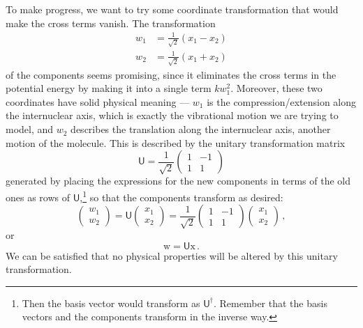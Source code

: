 \documentclass{article}
\theoremstyle{plain}\theoremheaderfont{\normalfont\itshape}\theorembodyfont{\rmfamily}\theoremseparator{.}\newtheorem*{rem}{Remark}\newtheorem*{ex}{Example}\newtheorem*{proof}{Proof}\newtheorem*{altp}{Alternative proof}
\theoremstyle{plain}\theoremheaderfont{\normalfont\bfseries}\theorembodyfont{\rmfamily}\theoremseparator{.}\newtheorem{thm}{Theorem}[section]\newtheorem{lem}[thm]{Lemma}\newtheorem{prop}[thm]{Proposition}\newtheorem*{cor}{Corollary}\newtheorem{defn}[thm]{Definition}\newtheorem{clm}[thm]{Claim}\newtheorem{clminproof}{Claim}
\theoremstyle{break}\theoremheaderfont{\normalfont\itshape}\theorembodyfont{\rmfamily}\theoremseparator{.\medskip}\newtheorem*{proofskip}{Proof}\newtheorem*{exs}{Examples}\newtheorem*{rems}{Remarks}
\theoremstyle{break}\theoremheaderfont{\normalfont\bfseries}\theorembodyfont{\rmfamily}\theoremseparator{.\medskip}\newtheorem{lemskip}[thm]{Lemma}\newtheorem{defnskip}[thm]{Definition}\newtheorem{propskip}[thm]{Proposition}\newtheorem{thmskip}[thm]{Theorem}
\numberwithin{equation}{section}
\newcommand{\vb}[1]{\bm{\mathrm{#1}}}
\begin{document}
    To make progress, we want to try some coordinate transformation that would make the cross terms vanish. The transformation
    \begin{equation}
        \begin{aligned}
            w_1&=\frac{1}{\sqrt{2}}(x_1-x_2)\\
            w_2&=\frac{1}{\sqrt{2}}(x_1+x_2)
        \end{aligned}
    \end{equation}
    of the components seems promising, since it eliminates the cross terms in the potential energy by making it into a single term \(kw_1^2\). Moreover, these two coordinates have solid physical meaning --- \(w_1\) is the compression/extension along the internuclear axis, which is exactly the vibrational motion we are trying to model, and \(w_2\) describes the translation along the internuclear axis, another motion of the molecule. This is described by the unitary transformation matrix
    \begin{equation}
        \mathsf{U}=\frac{1}{\sqrt{2}}\begin{pmatrix}
            1 & -1 \\
            1 & 1
        \end{pmatrix}
    \end{equation}
    generated by placing the expressions for the new components in terms of the old ones as rows of \(\mathsf{U}\),\footnote{Then the basis vector would transform as \(\mathsf{U}^\dagger\). Remember that the basis vectors and the components transform in the inverse way.} so that the components transform as desired:
    \begin{equation}
        \begin{pmatrix}
            w_1 \\ w_2
        \end{pmatrix}=\mathsf{U}\begin{pmatrix}
            x_1 \\ x_2
        \end{pmatrix}=\frac{1}{\sqrt{2}}\begin{pmatrix}
            1 & -1 \\
            1 & 1
        \end{pmatrix}\begin{pmatrix}
            x_1 \\ x_2
        \end{pmatrix}\,,
    \end{equation}
    or
    \begin{equation}
        \vb{w}=\mathsf{U}\vb{x}\,.
    \end{equation}
    We can be satisfied that no physical properties will be altered by this unitary transformation.
\end{document}
